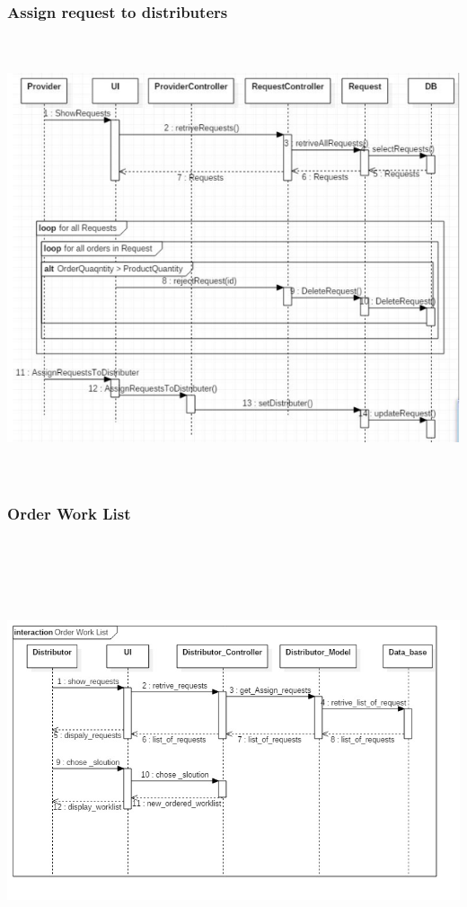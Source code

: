 \documentclass[12pt]{article}
\begin{document}
\subsubsection{ Assign request to distributers }
\begin{center}
	\includegraphics[width=17cm,height=13cm]{./assets/sequencediagram/assignrequeststodistributers.png}\\
\end{center}

\subsubsection{ Order Work List }
\begin{center}
	\includegraphics[width=17cm,height=13cm]{./assets/sequencediagram/orderworklist.png}\\
\end{center}
\end{document}
